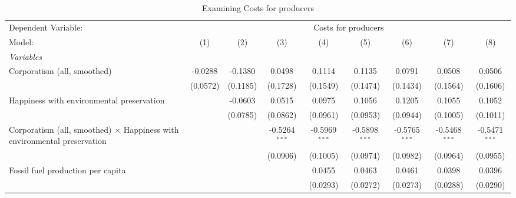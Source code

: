 
\begin{table}[htbp]
   \caption{Examining Costs for producers}
   \centering
   \begin{tabular}{lcccccccc}
      \tabularnewline \midrule \midrule
      Dependent Variable: & \multicolumn{8}{c}{Costs for producers}\\
      Model:                                                                          & (1)      & (2)      & (3)             & (4)             & (5)             & (6)             & (7)             & (8)\\  
      \midrule
      \emph{Variables}\\
      Corporatism (all, smoothed)                                                     & -0.0288  & -0.1380  & 0.0498          & 0.1114          & 0.1135          & 0.0791          & 0.0508          & 0.0506\\   
                                                                                      & (0.0572) & (0.1185) & (0.1728)        & (0.1549)        & (0.1474)        & (0.1434)        & (0.1564)        & (0.1606)\\   
      Happiness with environmental preservation                                       &          & -0.0603  & 0.0515          & 0.0975          & 0.1056          & 0.1205          & 0.1055          & 0.1052\\   
                                                                                      &          & (0.0785) & (0.0862)        & (0.0961)        & (0.0953)        & (0.0944)        & (0.1005)        & (0.1011)\\   
      Corporatism (all, smoothed) $\times$ Happiness with environmental preservation  &          &          & -0.5264$^{***}$ & -0.5969$^{***}$ & -0.5898$^{***}$ & -0.5765$^{***}$ & -0.5468$^{***}$ & -0.5471$^{***}$\\   
                                                                                      &          &          & (0.0906)        & (0.1005)        & (0.0974)        & (0.0982)        & (0.0964)        & (0.0955)\\   
      Fossil fuel production per capita                                               &          &          &                 & 0.0455          & 0.0463          & 0.0461          & 0.0398          & 0.0396\\   
                                                                                      &          &          &                 & (0.0293)        & (0.0272)        & (0.0273)        & (0.0288)        & (0.0290)\\   

\end{tabular}
\end{table}
